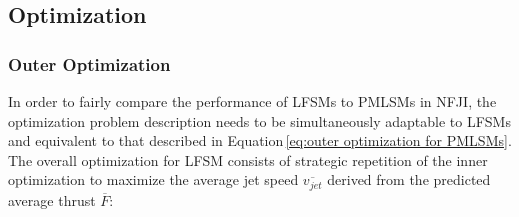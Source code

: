         
        \subsection{Optimization}                   \label{Chapter:RSM/LFSM/Optimization}
        
        
            \subsubsection{Outer Optimization}          \label{Chapter:RSM/LFSM/Optimization/Outer}
            
            
                In order to fairly compare the performance of \acsp{LFSM} to \acsp{PMLSM} in \acs{NFJI}, the optimization problem description needs to be simultaneously adaptable to \acsp{LFSM} and equivalent to that described in Equation\,\ref{eq:outer optimization for PMLSMs}. The overall optimization for \acs{LFSM} consists of strategic repetition of the inner optimization to maximize the average jet speed $\overline{v_{jet}}$ derived from the predicted average thrust $\overline{F}$:
                
